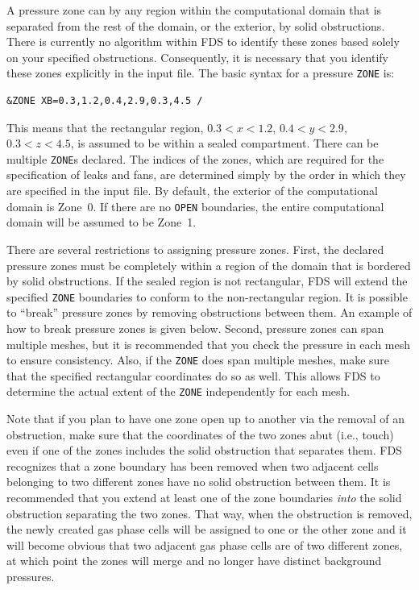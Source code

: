 \documentclass[11pt]{book}
\newcommand{\ct}{\tt\small}
\begin{document}
A pressure zone can by any region within the computational domain that is separated from the rest of the domain, or the exterior,
by solid obstructions. There is currently no algorithm within FDS to identify these zones based solely on your specified obstructions. Consequently, it is
necessary that you identify these zones explicitly in the input file. The basic syntax for a pressure {\ct ZONE} is:

\footnotesize
\begin{verbatim}
&ZONE XB=0.3,1.2,0.4,2.9,0.3,4.5 /
\end{verbatim}
\normalsize

\noindent
This means that the rectangular region, $0.3<x<1.2$, $0.4<y<2.9$, $0.3<z<4.5$, is assumed to be within a sealed compartment. There can be multiple {\ct ZONE}s
declared. The indices of the zones, which are required for the specification of leaks and fans, are determined simply by the order in which they are specified in the input file.
By default, the exterior of the computational
domain is Zone~0. If there are no {\ct OPEN} boundaries, the entire computational domain will be assumed to be Zone~1.

There are several restrictions to assigning pressure zones. First, the declared pressure zones must be completely within a region of the
domain that is bordered by solid obstructions. If the sealed region is not rectangular, FDS will extend the specified {\ct ZONE} boundaries to
conform to the non-rectangular region. It is possible to ``break'' pressure zones by removing
obstructions between them. An example of how to break pressure zones is given below.
Second, pressure zones can span multiple meshes, but it is recommended that you check the pressure in each mesh to ensure consistency. Also, if the {\ct ZONE} does span multiple
meshes, make sure that the specified rectangular coordinates do so as well. This allows FDS to determine the actual extent of the {\ct ZONE} independently for each
mesh.

Note that if you plan to have one zone open up to another via the removal of an obstruction, make sure that the coordinates of the two
zones abut (i.e., touch) even if one of the zones includes the solid obstruction that separates them. FDS recognizes that a zone boundary has been removed when
two adjacent cells belonging to two different zones have no solid obstruction between them. It is recommended that you extend at least one
of the zone boundaries {\em into} the solid obstruction separating the two zones. That way, when the obstruction is removed, the newly created
gas phase cells will be assigned to one or the other zone and it will become obvious that two adjacent gas phase cells are of two different zones, at
which point the zones will merge and no longer have distinct background pressures.
\end{document}
